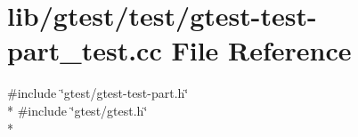 \hypertarget{gtest-test-part__test_8cc}{\section{lib/gtest/test/gtest-\/test-\/part\-\_\-test.cc File Reference}
\label{gtest-test-part__test_8cc}
}
{\ttfamily \#include \char`\"{}gtest/gtest-\/test-\/part.\-h\char`\"{}}\\*
{\ttfamily \#include \char`\"{}gtest/gtest.\-h\char`\"{}}\\*
